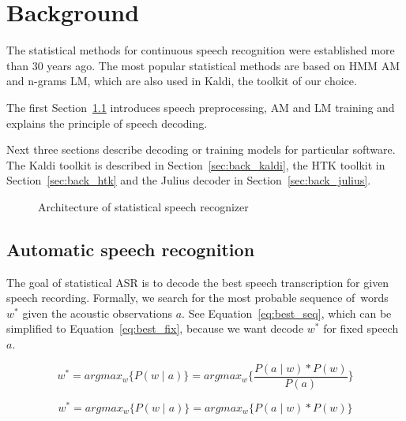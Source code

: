 \chapter{Background}
\label{cha:background}

The statistical methods for continuous speech recognition were established more than 30 years ago. 
The most popular statistical methods are based on \ac{HMM} \acl{AM} and n-grams \ac{LM},
which are also used in Kaldi, the toolkit of our choice.

The first Section~\ref{sec:back_asr} introduces speech preprocessing, \ac{AM} and \ac{LM} training
and explains the principle of speech decoding.

Next three sections describe decoding or training models for particular software.
The Kaldi toolkit is described in Section~\ref{sec:back_kaldi}, 
the \ac{HTK} toolkit in Section~\ref{sec:back_htk} and 
the Julius decoder in Section~\ref{sec:back_julius}.

\begin{figure}[!htp]
    \begin{center}
    
    \caption{Architecture of statistical speech recognizer\cite{ney1990acoustic}}
    \label{fig:components} 
    \end{center}
\end{figure}

\section{Automatic speech recognition}
\label{sec:back_asr}

The goal of statistical \ac{ASR} is to decode 
the best speech transcription for given speech recording.
Formally, we search for the most probable sequence of~words $w^*$ given the acoustic observations $a$.
See Equation~\ref{eq:best_seq}, which can be simplified to Equation~\ref{eq:best_fix},
because we want decode $w^*$ for fixed speech $a$.

\begin{equation}\label{eq:best_seq}
    w^* = argmax_{w}\{P(w \mid a)\} = argmax_{w}\{\frac{P(a \mid w) * P(w)}{P(a)}\}
\end{equation}

\begin{equation}\label{eq:best_fix}
    w^* = argmax_{w}\{P(w \mid a)\} = argmax_{w}\{P(a \mid w) * P(w)\}
\end{equation}

